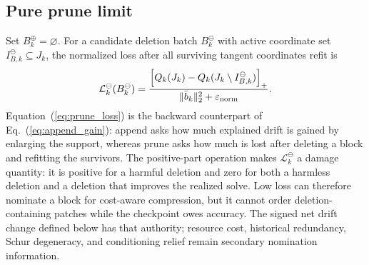 \documentclass[
  reprint,
  amsmath,
  amssymb,
  aps,
  pra,
  nofootinbib,
  superscriptaddress,
  floatfix
]{revtex4-2}
\newcommand{\eps}{\varepsilon}
\begin{document}
\subsection{Pure prune limit}

Set \(B_k^{\oplus}=\varnothing\).  For a candidate deletion batch \(B_k^{\ominus}\) with active coordinate set \(I_{B,k}^{\ominus}\subseteq J_k\), the normalized loss after all surviving tangent coordinates refit is
\begin{equation}
\mathcal L_k^{\ominus}(B_k^{\ominus})
=
\frac{
\left[
Q_k(J_k)
-Q_k(J_k\setminus I_{B,k}^{\ominus})
\right]_+
}{
\|\bar b_k\|_2^2+\eps_{\rm norm}
}.
\label{eq:prune_loss}
\end{equation}
Equation~(\ref{eq:prune_loss}) is the backward counterpart of Eq.~(\ref{eq:append_gain}): append asks how much explained drift is gained by enlarging the support, whereas prune asks how much is lost after deleting a block and refitting the survivors.  The positive-part operation makes $\mathcal L_k^{\ominus}$ a damage quantity: it is positive for a harmful deletion and zero for both a harmless deletion and a deletion that improves the realized solve.  Low loss can therefore nominate a block for cost-aware compression, but it cannot order deletion-containing patches while the checkpoint owes accuracy.  The signed net drift change defined below has that authority; resource cost, historical redundancy, Schur degeneracy, and conditioning relief remain secondary nomination information.
\end{document}
